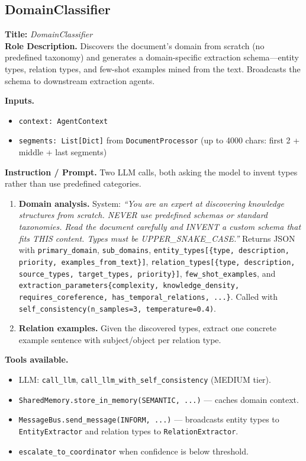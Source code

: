 \documentclass{article}
\begin{document}
\newpage
\subsection{DomainClassifier}
\label{app:domain_classifier}

\begin{agentbox}
\textbf{Title:} \textit{DomainClassifier}\\
\textbf{Role Description.} Discovers the document's domain from
scratch (no predefined taxonomy) and generates a domain-specific
extraction schema---entity types, relation types, and few-shot
examples mined from the text. Broadcasts the schema to downstream
extraction agents.

\textbf{Inputs.}
\begin{itemize}[leftmargin=*,nosep]
\item \texttt{context: AgentContext}
\item \texttt{segments: List[Dict]} from \texttt{DocumentProcessor} (up to 4000 chars: first 2 + middle + last segments)
\end{itemize}

\textbf{Instruction / Prompt.} Two LLM calls, both asking the model to invent types rather than use predefined categories.
\begin{enumerate}[leftmargin=*,nosep]
\item \textbf{Domain analysis.} System: \textit{``You are an expert at discovering knowledge structures from scratch. NEVER use predefined schemas or standard taxonomies. Read the document carefully and INVENT a custom schema that fits THIS content. Types must be UPPER\_SNAKE\_CASE.''} Returns JSON with \texttt{primary\_domain}, \texttt{sub\_domains}, \texttt{entity\_types[\{type, description, priority, examples\_from\_text\}]}, \texttt{relation\_types[\{type, description, source\_types, target\_types, priority\}]}, \texttt{few\_shot\_examples}, and \texttt{extraction\_parameters\{complexity, knowledge\_density, requires\_coreference, has\_temporal\_relations, ...\}}. Called with \texttt{self\_consistency(n\_samples=3, temperature=0.4)}.
\item \textbf{Relation examples.} Given the discovered types, extract one concrete example sentence with subject/object per relation type.
\end{enumerate}

\textbf{Tools available.}
\begin{itemize}[leftmargin=*,nosep]
\item LLM: \texttt{call\_llm}, \texttt{call\_llm\_with\_self\_consistency} (MEDIUM tier).
\item \texttt{SharedMemory.store\_in\_memory(SEMANTIC, ...)} --- caches domain context.
\item \texttt{MessageBus.send\_message(INFORM, ...)} --- broadcasts entity types to \texttt{EntityExtractor} and relation types to \texttt{RelationExtractor}.
\item \texttt{escalate\_to\_coordinator} when confidence is below threshold.
\end{itemize}


\end{agentbox}
\end{document}
